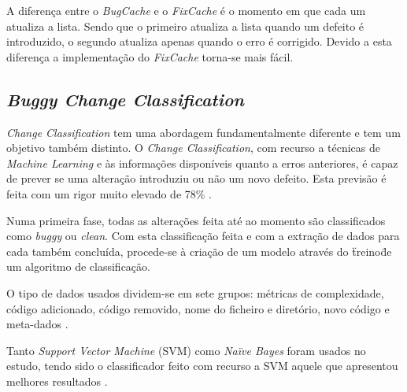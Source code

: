 A diferença entre o \emph{BugCache} e o \emph{FixCache} é o momento em que cada um atualiza a lista. Sendo que o primeiro atualiza a lista quando um defeito é introduzido, o segundo atualiza apenas quando o erro é corrigido. Devido a esta diferença a implementação do \emph{FixCache} torna-se mais fácil.

\subsection{\emph{Buggy Change Classification}}

\emph{Change Classification} tem uma abordagem fundamentalmente diferente e tem um objetivo também distinto. O \emph{Change Classification}, com recurso a técnicas de \emph{Machine Learning} e às informações disponíveis quanto a erros anteriores, é capaz de prever se uma alteração introduziu ou não um novo defeito. Esta previsão é feita com um rigor muito elevado de 78\% \cite{Whitehead2008}.

Numa primeira fase, todas as alterações feita até ao momento são classificados como \emph{buggy} ou \emph{clean}. Com esta classificação feita e com a extração de dados para cada também concluída, procede-se à criação de um modelo através do \"treino\" de um algoritmo de classificação.

O tipo de dados usados dividem-se em sete grupos: métricas de complexidade, código adicionado, código removido, nome do ficheiro e diretório, novo código e meta-dados \cite{Whitehead2008}.

Tanto \emph{Support Vector Machine} (SVM) como \emph{Naïve Bayes} foram usados no estudo, tendo sido o classificador feito com recurso a SVM aquele que apresentou melhores resultados \cite{Whitehead2008}.